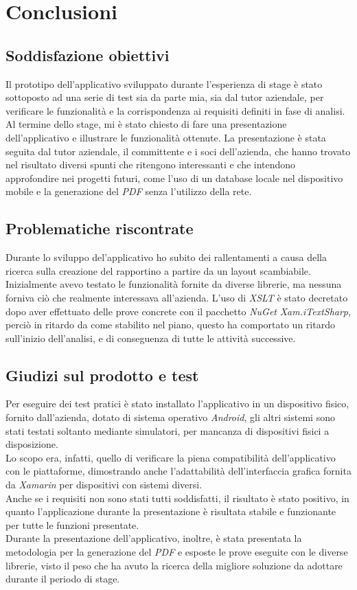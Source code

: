\newpage
\chapter{Conclusioni}
\label{cap:conclusioni}

\section{Soddisfazione obiettivi}
Il prototipo dell'applicativo sviluppato durante l'esperienza di stage è stato sottoposto ad una serie di test sia da parte mia, sia dal tutor aziendale, per verificare le funzionalità e la corrispondenza ai requisiti definiti in fase di analisi.
\\
Al termine dello stage, mi è stato chiesto di fare una presentazione dell'applicativo e illustrare le funzionalità ottenute. La presentazione è stata seguita dal tutor aziendale, il committente e i soci dell'azienda, che hanno trovato nel risultato diversi spunti che ritengono interessanti e che intendono approfondire nei progetti futuri, come l'uso di un database locale nel dispositivo mobile e la generazione del \textit{PDF} senza l'utilizzo della rete. 
\section{Problematiche riscontrate}
Durante lo sviluppo del'applicativo ho subito dei rallentamenti a causa della ricerca sulla creazione del rapportino a partire da un layout scambiabile. Inizialmente avevo testato le funzionalità fornite da diverse librerie, ma nessuna forniva ciò che realmente interessava all'azienda. L'uso di \textit{XSLT} è stato decretato dopo aver effettuato delle prove concrete con il pacchetto \textit{NuGet} \textit{Xam.iTextSharp}, perciò in ritardo da come stabilito nel piano, questo ha comportato un ritardo sull'inizio dell'analisi, e di conseguenza di tutte le attività successive.  
\section{Giudizi sul prodotto e test}
Per eseguire dei test pratici è stato installato l'applicativo in un dispositivo fisico, fornito dall'azienda, dotato di sistema operativo \textit{Android}, gli altri sistemi sono stati testati soltanto mediante simulatori, per mancanza di dispositivi fisici a disposizione. \\
Lo scopo era, infatti, quello di verificare la piena compatibilità dell'applicativo con le piattaforme, dimostrando anche l'adattabilità dell'interfaccia grafica fornita da \textit{Xamarin} per dispositivi con sistemi diversi.
\\
Anche se i requisiti non sono stati tutti soddisfatti, il risultato è stato positivo, in quanto l'applicazione durante la presentazione è risultata stabile e funzionante per tutte le funzioni presentate.
\\
Durante la presentazione dell'applicativo, inoltre, è stata presentata la metodologia per la generazione del \textit{PDF} e esposte le prove eseguite con le diverse librerie, visto il peso che ha avuto la ricerca della migliore soluzione da adottare durante il periodo di stage.
